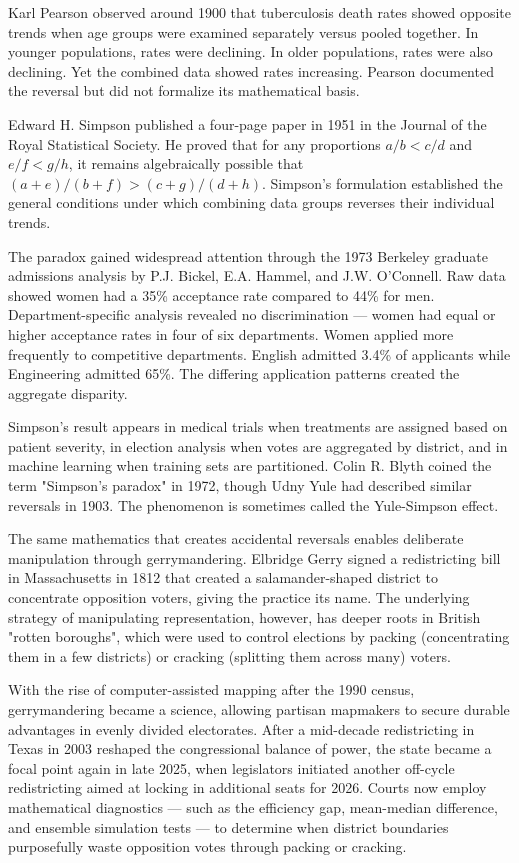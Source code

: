 \begin{historical}
Karl Pearson observed around 1900 that tuberculosis death rates showed opposite trends when age groups were examined separately versus pooled together. In younger populations, rates were declining. In older populations, rates were also declining. Yet the combined data showed rates increasing. Pearson documented the reversal but did not formalize its mathematical basis.

Edward H. Simpson published a four-page paper in 1951 in the Journal of the Royal Statistical Society. He proved that for any proportions $a/b < c/d$ and $e/f < g/h$, it remains algebraically possible that $(a+e)/(b+f) > (c+g)/(d+h)$. Simpson's formulation established the general conditions under which combining data groups reverses their individual trends.

The paradox gained widespread attention through the 1973 Berkeley graduate admissions analysis by P.J. Bickel, E.A. Hammel, and J.W. O'Connell. Raw data showed women had a 35\% acceptance rate compared to 44\% for men. Department-specific analysis revealed no discrimination — women had equal or higher acceptance rates in four of six departments. Women applied more frequently to competitive departments. English admitted 3.4\% of applicants while Engineering admitted 65\%. The differing application patterns created the aggregate disparity.

Simpson's result appears in medical trials when treatments are assigned based on patient severity, in election analysis when votes are aggregated by district, and in machine learning when training sets are partitioned. Colin R. Blyth coined the term "Simpson's paradox" in 1972, though Udny Yule had described similar reversals in 1903. The phenomenon is sometimes called the Yule-Simpson effect.

The same mathematics that creates accidental reversals enables deliberate manipulation through gerrymandering. Elbridge Gerry signed a redistricting bill in Massachusetts in 1812 that created a salamander-shaped district to concentrate opposition voters, giving the practice its name. The underlying strategy of manipulating representation, however, has deeper roots in British "rotten boroughs", which were used to control elections by packing (concentrating them in a few districts) or cracking (splitting them across many) voters.

With the rise of computer-assisted mapping after the 1990 census, gerrymandering became a science, allowing partisan mapmakers to secure durable advantages in evenly divided electorates. After a mid-decade redistricting in Texas in 2003 reshaped the congressional balance of power, the state became a focal point again in late 2025, when legislators initiated another off-cycle redistricting aimed at locking in additional seats for 2026. Courts now employ mathematical diagnostics — such as the efficiency gap, mean-median difference, and ensemble simulation tests — to determine when district boundaries purposefully waste opposition votes through packing or cracking. 
\end{historical}
